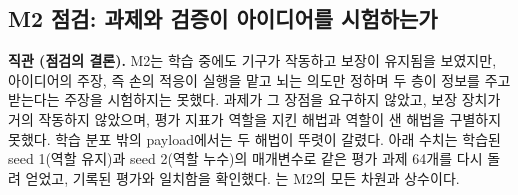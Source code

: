 \documentclass[11pt]{article}\usepackage[margin=1in]{geometry}\usepackage{amsmath,amssymb,amsthm,mathtools}\usepackage{graphicx}\graphicspath{{figures/}{../figures/}{figs/}{./}}\usepackage{enumitem}\usepackage{hyperref}\usepackage{cleveref}\usepackage{tikz}\usetikzlibrary{arrows.meta,positioning,calc,shapes.geometric}\usepackage{float}\usepackage{rotating}\usepackage[most]{tcolorbox}\usepackage{kotex}\usepackage{booktabs}\usepackage{longtable}\emergencystretch=1.6em\tolerance=2000 \crefname{assumption}{Assumption}{Assumptions}\Crefname{assumption}{Assumption}{Assumptions}\crefname{definition}{Definition}{Definitions}\Crefname{definition}{Definition}{Definitions}\crefname{proposition}{Proposition}{Propositions}\Crefname{proposition}{Proposition}{Propositions}\crefname{fact}{Fact}{Facts}\Crefname{fact}{Fact}{Facts} \newtheorem{assumption}{Assumption}\newtheorem{definition}{Definition}\newtheorem{lemma}{Lemma}\newtheorem{proposition}{Proposition}\newtheorem{theorem}{Theorem}\newtheorem{corollary}{Corollary}\newtheorem{fact}{Fact}\theoremstyle{remark}\newtheorem{remark}{Remark} \newcommand{\R}{\mathbb{R}}\newcommand{\xb}{\bar x}\newcommand{\Ab}{\bar A}\newcommand{\By}{\bar B_y}\newcommand{\U}{\mathcal U}\newcommand{\Z}{\mathcal Z}
\begin{document}
\subsection{M2 점검: 과제와 검증이 아이디어를 시험하는가}
\label{sec:m2audit}

\textbf{직관 (점검의 결론).} M2는 학습 중에도 기구가 작동하고 보장이 유지됨을 보였지만, 아이디어의 주장, 즉 손의 적응이 실행을 맡고 뇌는 의도만 정하며 두 층이 정보를 주고받는다는 주장을 시험하지는 못했다. 과제가 그 장점을 요구하지 않았고, 보장 장치가 거의 작동하지 않았으며, 평가 지표가 역할을 지킨 해법과 역할이 샌 해법을 구별하지 못했다. 학습 분포 밖의 payload에서는 두 해법이 뚜렷이 갈렸다. 아래 수치는 학습된 seed 1(역할 유지)과 seed 2(역할 누수)의 매개변수로 같은 평가 과제 64개를 다시 돌려 얻었고, 기록된 평가와 일치함을 확인했다. 는 M2의 모든 차원과 상수이다.
\end{document}
